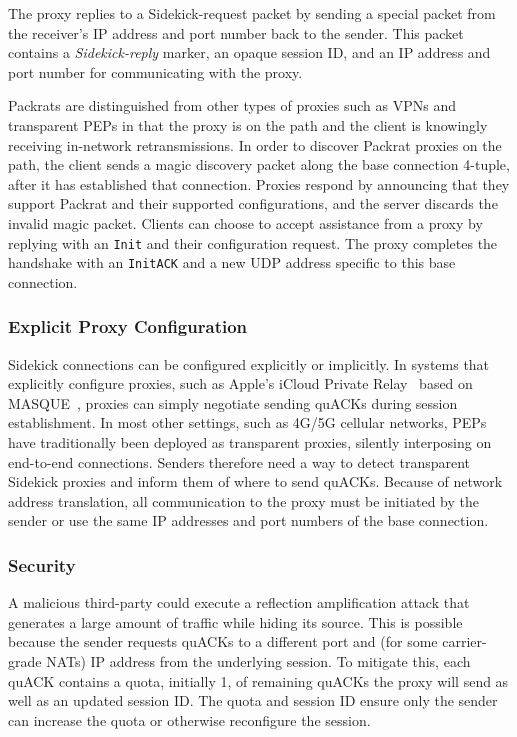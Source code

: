 The proxy replies to a Sidekick-request packet by sending a special packet
from the receiver's IP address and port number back to the sender.
This packet contains a \emph{Sidekick-reply} marker, an opaque session ID, and an
IP address and port number for communicating with the proxy.

Packrats are distinguished from other types of proxies such as VPNs and
transparent PEPs in that the proxy is on the path and the client is knowingly
receiving in-network retransmissions. In order to discover Packrat proxies on the
path, the client sends a magic discovery packet along the base connection
4-tuple, after it has established that connection. Proxies respond by
announcing that they support Packrat and their supported configurations, and the
server discards the invalid magic packet. Clients can choose to accept
assistance from a proxy by replying with an \texttt{Init} and their
configuration request. The proxy completes the handshake with an \texttt
{InitACK} and a new UDP address specific to this base connection.

\subsubsection{Explicit Proxy Configuration}

Sidekick connections can be configured explicitly or implicitly.  In systems that
explicitly configure proxies, such as Apple's iCloud Private Relay~\cite{icloud-private-relay}
based on MASQUE~\cite{kosek2021masque,kramer2021masquepep}, proxies can simply negotiate
sending quACKs during session establishment.  In most other settings,
such as 4G/5G cellular networks, PEPs have traditionally been deployed
as transparent proxies, silently interposing on end-to-end
connections.  Senders therefore need a way to detect transparent Sidekick
proxies and inform them of where to send quACKs.  Because of network
address translation, all communication to the proxy must be initiated
by the sender or use the same IP addresses and port numbers of the
base connection.

\subsubsection{Security}
A malicious third-party could execute a reflection amplification attack that
generates a large amount of traffic while hiding its source. This is
possible because the sender requests quACKs to a different port and (for some
carrier-grade NATs) IP address from the underlying session. To mitigate this,
each quACK contains a quota, initially 1, of remaining quACKs the proxy will
send as well as an updated session ID\@.
The quota and session ID ensure only the sender can increase the quota or
otherwise reconfigure the session.

